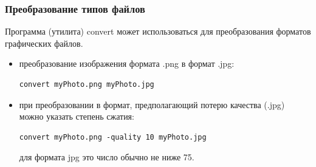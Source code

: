 \documentclass[11pt, compress]{beamer}
\renewcommand{\emph}[1]{\textcolor{dark-blue}{#1}}
\begin{document}
\begin{frame}[c, fragile]
\frametitle{Преобразование типов файлов}
Программа (утилита) \emph{convert} может использоваться для преобразования форматов графических файлов. 
\begin{itemize}
\item преобразование изображения формата \emph{.png} в формат \emph{.jpg}:
\begin{lstlisting}
convert myPhoto.png myPhoto.jpg
\end{lstlisting}
\item при преобразовании в формат, предполагающий потерю качества (\emph{.jpg}) можно указать степень сжатия: 
\begin{lstlisting}
convert myPhoto.png -quality 10 myPhoto.jpg
\end{lstlisting}
для формата jpg это число обычно не ниже 75.
\end{itemize}
\end{frame}
\end{document}
